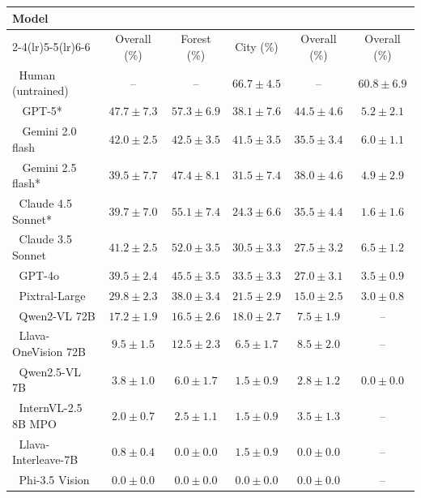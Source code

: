\begin{center}
\begin{tabular}{lccccc}
\toprule
\multirow{2}{*}{Model} & \multicolumn{3}{c}{\challenge{}} & \anomalychallenge{} & {\hardchallenge{}} \\
\cmidrule(lr){2-4}\cmidrule(lr){5-5}\cmidrule(lr){6-6}
 & Overall (\%) & Forest (\%) & City (\%) & Overall (\%) & Overall (\%)\\
\midrule
{\emojifont🧍} Human (untrained) & -- & -- &  $66.7 \pm 4.5$ & -- & $60.8 \pm 6.9$ \\
\midrule
{\emojifont🥇🤖} GPT-5* & $ \mathbf{47.7 \pm 7.3} $ & $ \mathbf{57.3 \pm 6.9} $ & $ 38.1 \pm 7.6 $ & $ \mathbf{44.5 \pm 4.6} $ & $ 5.2 \pm 2.1 $ \\
{\emojifont🥈🤖} Gemini 2.0 flash & $ 42.0 \pm 2.5 $ & $ 42.5 \pm 3.5 $ & $ \mathbf{41.5 \pm 3.5} $ & $ 35.5 \pm 3.4 $ & $ 6.0 \pm 1.1 $ \\
{\emojifont🥉🤖} Gemini 2.5 flash* & $ 39.5 \pm 7.7 $ & $ 47.4 \pm 8.1 $ & $ 31.5 \pm 7.4 $ & $ 38.0 \pm 4.6 $ & $ 4.9 \pm 2.9 $ \\
{\emojifont🤖} Claude 4.5 Sonnet* & $ 39.7 \pm 7.0 $ & $ 55.1 \pm 7.4 $ & $ 24.3 \pm 6.6 $ & $ 35.5 \pm 4.4 $ & $ 1.6 \pm 1.6 $ \\
{\emojifont🤖} Claude 3.5 Sonnet & $ 41.2 \pm 2.5 $ & $ 52.0 \pm 3.5 $ & $ 30.5 \pm 3.3 $ & $ 27.5 \pm 3.2 $ & $ \mathbf{6.5 \pm 1.2} $  \\
{\emojifont🤖} GPT-4o & $ 39.5 \pm 2.4 $ & $ 45.5 \pm 3.5 $ & $ 33.5 \pm 3.3 $ & $ 27.0 \pm 3.1 $ & $ 3.5 \pm 0.9 $ \\
\midrule
{\emojifont🤖} Pixtral-Large & $ 29.8 \pm 2.3 $ & $ 38.0 \pm 3.4 $ & $ 21.5 \pm 2.9 $ & $ 15.0 \pm 2.5 $ & $ 3.0 \pm 0.8 $\\
{\emojifont🤖} Qwen2-VL 72B & $ 17.2 \pm 1.9 $ & $ 16.5 \pm 2.6 $ & $ 18.0 \pm 2.7 $ & $ 7.5 \pm 1.9 $ & --\\
{\emojifont🤖} Llava-OneVision 72B & $ 9.5 \pm 1.5 $ & $ 12.5 \pm 2.3 $ & $ 6.5 \pm 1.7 $ & $ 8.5 \pm 2.0 $ & -- \\
\midrule
{\emojifont🤖} Qwen2.5-VL 7B & $ 3.8 \pm 1.0 $ & $ 6.0 \pm 1.7 $ & $ 1.5 \pm 0.9 $ & $ 2.8 \pm 1.2 $ & $0.0 \pm 0.0$ \\
{\emojifont🤖} InternVL-2.5 8B MPO & $ 2.0 \pm 0.7 $ & $ 2.5 \pm 1.1 $ & $ 1.5 \pm 0.9 $ & $ 3.5 \pm 1.3 $ & --\\
{\emojifont🤖} Llava-Interleave-7B & $ 0.8 \pm 0.4 $ & $ 0.0 \pm 0.0 $ & $ 1.5 \pm 0.9 $ & $ 0.0 \pm 0.0 $ & --\\
{\emojifont🤖} Phi-3.5 Vision & $ 0.0 \pm 0.0 $ & $ 0.0 \pm 0.0 $ & $ 0.0 \pm 0.0 $ & $ 0.0 \pm 0.0 $ & --\\
\bottomrule
\end{tabular}
\end{center}
